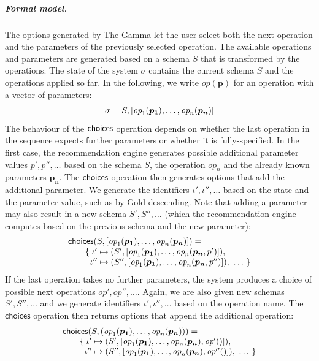 \documentclass[ a4paper,UKenglish,cleveref, autoref, thm-restate]{lipics-v2021}
\newcommand{\ident}[1]{\textsf{#1}}
\newcommand{\ddident}[1]{\guillemotleft\ident{#1}\guillemotright}
\newcommand{\choices}{\textnormal{\ident{choices}}}
\newcommand{\op}{\textit{op}}
\newcommand{\vect}[1]{\lbrack #1 \rbrack}
\begin{document}
\subparagraph{Formal model.}
The options generated by The Gamma let the user select both the next operation and the parameters
of the previously selected operation. The available operations and parameters are generated
based on a schema $S$ that is transformed by the operations. The state of the system $\sigma$
contains the current schema $S$ and the operations applied so far. In the following, we write
$\op(\boldsymbol{p})$ for an operation with a vector of parameters:
\[
\sigma = S, \vect{\op_1(\boldsymbol{p_1}), \ldots, \op_n(\boldsymbol{p_n})}\\
\]
The behaviour of the $\choices$ operation depends on whether the last operation in the sequence
expects further parameters or whether it is fully-specified. In the first case, the recommendation
engine generates possible additional parameter values $p', p'', \ldots$ based on the schema $S$,
the operation $\op_n$ and the already known parameters $\boldsymbol{p_n}$.
The $\choices$ operation then generates options that add the additional parameter. We generate the
identifiers $\iota',\iota'',\ldots$ based on the state and the parameter value, such as
\ddident{by Gold descending}. Note that adding a parameter may also result in a new schema
$S', S'', \ldots$ (which the recommendation engine computes based on the previous schema and the new parameter):
\[
\begin{array}{l}
\choices(S, \vect{\op_1(\boldsymbol{p_1}), \ldots, \op_n(\boldsymbol{p_n})}) =\\
\qquad \{\; \iota' \mapsto (S', \vect{\op_1(\boldsymbol{p_1}), \ldots, \op_n(\boldsymbol{p_n},p')}), \\
\qquad\;\;    \iota'' \mapsto (S'', \vect{\op_1(\boldsymbol{p_1}), \ldots, \op_n(\boldsymbol{p_n},p'')}), ~\ldots~\}
\end{array}
\]
If the last operation takes no further parameters, the system produces a choice
of possible next operations $\op', \op'', \ldots$. Again, we are also given new schemas $S', S'', \ldots$
and we generate identifiers $\iota',\iota'',\ldots$ based on the operation name. The $\ident{choices}$
operation then returns options that append the additional operation:
\[
\begin{array}{l}
\choices(S, (\op_1(\boldsymbol{p_1}), \ldots, \op_n(\boldsymbol{p_n}))) =\\
\qquad \{\; \iota' \mapsto (S', \vect{\op_1(\boldsymbol{p_1}), \ldots, \op_n(\boldsymbol{p_n}), \op'()}), \\
\qquad \;\; \iota'' \mapsto (S'', \vect{\op_1(\boldsymbol{p_1}), \ldots, \op_n(\boldsymbol{p_n}), \op''()}), ~\ldots~\}
\end{array}
\]
\end{document}
